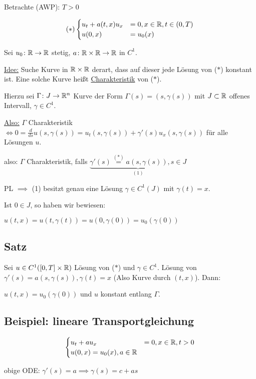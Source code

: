 Betrachte (AWP): $T > 0$

$$
(\ast) 
\begin{cases}
  u_t + a(t,x)u_x &= 0, x \in \mathbb{R}, t \in (0,T) \\
  u(0,x) &= u_0(x)
\end{cases}
$$

Sei $u_0 \colon \mathbb{R} \to \mathbb{R}$ stetig, $a \colon \mathbb{R} \times \mathbb{R} \to \mathbb{R}$ in $C^1$.

\underline{Idee:} Suche Kurve in $\mathbb{R} \times \mathbb{R}$ derart, dass auf dieser jede Lösung von ($\ast$) konstant ist.
Eine solche Kurve heißt \underline{Charakteristik} von ($\ast$).

Hierzu sei $\Gamma \colon J \to \mathbb{R}^n$ Kurve der Form $\Gamma(s) = (s, \gamma(s))$ mit $J \subset \mathbb{R}$ offenes Intervall, $\gamma \in C^1$.

\underline{Also:} $\Gamma$ Charakteristik $\iff 0 = \frac{d}{ds} u(s,\gamma(s)) = u_t(s,\gamma(s)) + \gamma'(s) u_x(s,\gamma(s))$ für alle Lösungen $u$.

also: $\Gamma$ Charakteristik, falls $\underbrace{\gamma'(s) \overset{(\ast)}{=} a(s,\gamma(s)), s \in J}_{(1)}$

PL $\implies$ (1) besitzt genau eine Lösung $\gamma \in C^1(J)$ mit $\gamma(t) = x$.

Ist $0 \in J$, so haben wir bewiesen:

$u(t,x) = u(t, \gamma(t)) = u(0, \gamma(0)) = u_0(\gamma(0))$

\subsection{Satz}

Sei $u \in C^1([0,T] \times \mathbb{R})$ Lösung von ($\ast$) und $\gamma \in C^1$.
Lösung von $\gamma'(s) = a(s,\gamma(s)), \gamma(t) = x$ {\tiny{(Also Kurve durch $(t,x)$)}}. Dann:

$u(t,x) = u_0(\gamma(0))$ und $u$ konstant entlang $\Gamma$.

\subsection{Beispiel: lineare Transportgleichung}

$$
\begin{cases}
  u_t + a u_x &= 0, x \in \mathbb{R}, t> 0 \\
  u(0,x) = u_0(x), a \in \mathbb{R}
\end{cases}
$$

obige ODE: $\gamma'(s) = a \implies \gamma(s) = c + as$

